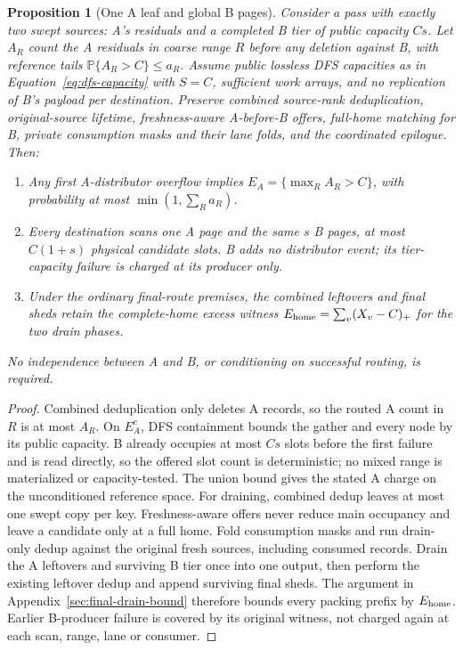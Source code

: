 \documentclass[11pt]{article}
\newtheorem{proposition}[theorem]{Proposition}
\theoremstyle{definition}
\theoremstyle{remark}
\newcommand{\Prb}{\mathbb P}
\begin{document}
\begin{proposition}[One A leaf and global B pages]
\label{prop:separated-capacity}
Consider a pass with exactly two swept sources: A's residuals and a
completed B tier of public capacity $Cs$. Let $A_R$ count the A residuals
in coarse range $R$ before any deletion against B, with reference tails
$\Prb\{A_R>C\}\le a_R$. Assume public lossless DFS capacities as in
Equation~\eqref{eq:dfs-capacity} with $S=C$, sufficient work arrays, and
no replication of B's payload per destination. Preserve combined source-rank
deduplication, original-source lifetime, freshness-aware A-before-B offers,
full-home matching for B, private consumption masks and their lane folds,
and the coordinated epilogue. Then:
\begin{enumerate}
\item Any first A-distributor overflow implies
      $E_A=\{\max_R A_R>C\}$, with probability at most
      $\min(1,\sum_R a_R)$.
\item Every destination scans one A page and the same $s$ B pages,
      at most $C(1+s)$ physical candidate slots. B adds no distributor
      event; its tier-capacity failure is charged at its producer only.
\item Under the ordinary final-route premises, the combined leftovers
      and final sheds retain the complete-home excess witness
      $E_{\rm home}=\sum_v(X_v-C)_+$ for the two drain phases.
\end{enumerate}
No independence between A and B, or conditioning on successful routing,
is required.
\end{proposition}
\begin{proof}
Combined deduplication only deletes A records, so the routed A count in
$R$ is at most $A_R$. On $E_A^c$, DFS containment bounds the gather and
every node by its public capacity. B already occupies at most $Cs$ slots
before the first failure and is read directly, so the offered slot count
is deterministic; no mixed range is materialized or capacity-tested.
The union bound gives the stated A charge on the unconditioned reference
space. For draining, combined dedup leaves at most one swept copy per key.
Freshness-aware offers never reduce main occupancy and leave a candidate
only at a full home. Fold consumption masks and run drain-only dedup
against the original fresh sources, including consumed records. Drain the
A leftovers and surviving B tier once into one output, then perform the
existing leftover dedup and append surviving final sheds. The argument in
Appendix~\ref{sec:final-drain-bound} therefore bounds every packing prefix
by $E_{\rm home}$. Earlier B-producer failure is covered by its original
witness, not charged again at each scan, range, lane or consumer.
\end{proof}
\end{document}
